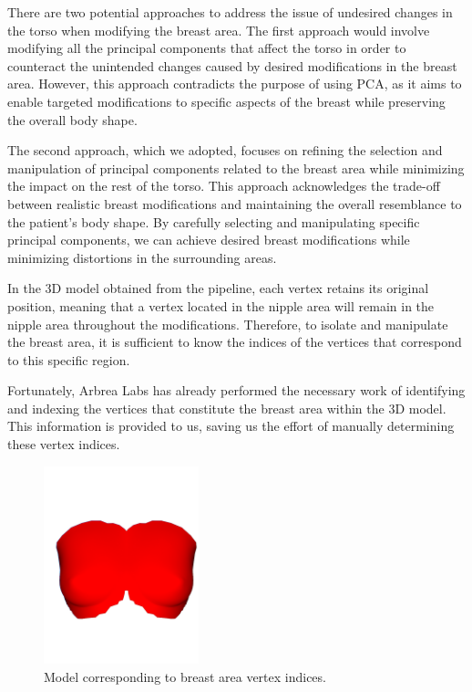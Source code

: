 There are two potential approaches to address the issue of undesired changes in the torso when modifying the breast area. The first approach would involve modifying all the 
principal components that affect the torso in order to counteract the unintended changes caused by desired modifications in the breast area. However, 
this approach contradicts the purpose of using PCA, as it aims to enable targeted modifications to specific aspects of the breast while preserving the overall body shape.

The second approach, which we adopted, focuses on refining the selection and manipulation of principal components related to the breast area while minimizing the impact on the rest of the torso. 
This approach acknowledges the trade-off between realistic breast modifications and maintaining the overall resemblance to the patient's body shape. By carefully selecting and manipulating 
specific principal components, we can achieve desired breast modifications while minimizing distortions in the surrounding areas.

In the 3D model obtained from the pipeline, each vertex retains its original position, meaning that a vertex located in the nipple area will remain in the nipple area throughout the modifications. 
Therefore, to isolate and manipulate the breast area, it is sufficient to know the indices of the vertices that correspond to this specific region.

Fortunately, Arbrea Labs has already performed the necessary work of identifying and indexing the vertices that constitute the breast area within the 3D model. This information is provided to us, 
saving us the effort of manually determining these vertex indices.

\begin{figure}[H]
    \centering
    \includegraphics[width = 0.4\textwidth]{figures/20230529-pca_breastspecific_top.jpg}
    \caption{Model corresponding to breast area vertex indices.}
    \label{fig:pca_breastspecific_top}
\end{figure}

